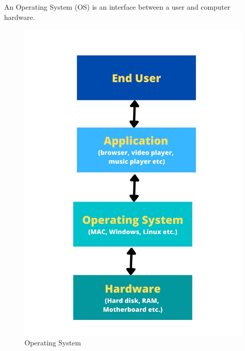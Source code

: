 
\begin{flushleft}
	An Operating System (OS) is an interface between a user and computer hardware.
	\bigskip
	\begin{figure}[h!]
		\centering
		\includegraphics[scale=.3]{content/chapter1/images/os.jpg}
		\caption{Operating System}
		\label{fig:OS}
	\end{figure}
\end{flushleft}

\newpage

